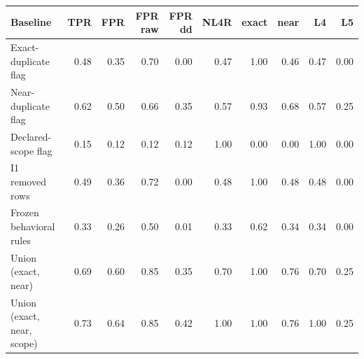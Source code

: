 \begin{tabular}{lrrrrrrrrr}\toprule
Baseline & TPR & FPR & FPR raw & FPR dd & NL4R & exact & near & L4 & L5\\\midrule
Exact-duplicate flag & 0.48 & 0.35 & 0.70 & 0.00 & 0.47 & 1.00 & 0.46 & 0.47 & 0.00\\
Near-duplicate flag & 0.62 & 0.50 & 0.66 & 0.35 & 0.57 & 0.93 & 0.68 & 0.57 & 0.25\\
Declared-scope flag & 0.15 & 0.12 & 0.12 & 0.12 & 1.00 & 0.00 & 0.00 & 1.00 & 0.00\\
I1 removed rows & 0.49 & 0.36 & 0.72 & 0.00 & 0.48 & 1.00 & 0.48 & 0.48 & 0.00\\
Frozen behavioral rules & 0.33 & 0.26 & 0.50 & 0.01 & 0.33 & 0.62 & 0.34 & 0.34 & 0.00\\
Union (exact, near) & 0.69 & 0.60 & 0.85 & 0.35 & 0.70 & 1.00 & 0.76 & 0.70 & 0.25\\
Union (exact, near, scope) & 0.73 & 0.64 & 0.85 & 0.42 & 1.00 & 1.00 & 0.76 & 1.00 & 0.25\\
\bottomrule\end{tabular}
